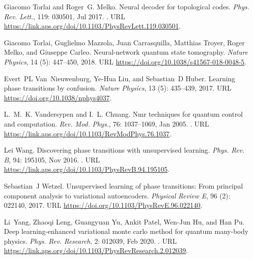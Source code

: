 \documentclass[a4paper,aps,amsmath,amssymb,twocolumn,longbibliography,,accepted=2022-05-17]{quantumarticle}
\begin{document}
\begin{thebibliography}{52}
Giacomo Torlai and Roger~G. Melko.
\newblock Neural decoder for topological codes.
\newblock \emph{Phys. Rev. Lett.}, 119: 030501, Jul 2017.
\newblock {}.
\newblock URL \url{https://link.aps.org/doi/10.1103/PhysRevLett.119.030501}.

Giacomo Torlai, Guglielmo Mazzola, Juan Carrasquilla, Matthias Troyer, Roger
  Melko, and Giuseppe Carleo.
\newblock Neural-network quantum state tomography.
\newblock \emph{Nature Physics}, 14 (5): 447--450, 2018.
\newblock URL \url{https://doi.org/10.1038/s41567-018-0048-5}.

Evert~PL Van~Nieuwenburg, Ye-Hua Liu, and Sebastian~D Huber.
\newblock Learning phase transitions by confusion.
\newblock \emph{Nature Physics}, 13 (5): 435--439, 2017.
\newblock URL \url{https://doi.org/10.1038/nphys4037}.

L.~M.~K. Vandersypen and I.~L. Chuang.
\newblock Nmr techniques for quantum control and computation.
\newblock \emph{Rev. Mod. Phys.}, 76: 1037--1069, Jan 2005.
\newblock {}.
\newblock URL \url{https://link.aps.org/doi/10.1103/RevModPhys.76.1037}.

Lei Wang.
\newblock Discovering phase transitions with unsupervised learning.
\newblock \emph{Phys. Rev. B}, 94: 195105, Nov 2016.
\newblock {}.
\newblock URL \url{https://link.aps.org/doi/10.1103/PhysRevB.94.195105}.

Sebastian~J Wetzel.
\newblock Unsupervised learning of phase transitions: From principal component
  analysis to variational autoencoders.
\newblock \emph{Physical Review E}, 96 (2): 022140, 2017.
\newblock URL \url{https://doi.org/10.1103/PhysRevE.96.022140}.

Li~Yang, Zhaoqi Leng, Guangyuan Yu, Ankit Patel, Wen-Jun Hu, and Han Pu.
\newblock Deep learning-enhanced variational monte carlo method for quantum
  many-body physics.
\newblock \emph{Phys. Rev. Research}, 2: 012039, Feb 2020.
\newblock {}.
\newblock URL \url{https://link.aps.org/doi/10.1103/PhysRevResearch.2.012039}.

\end{thebibliography}
\end{document}
